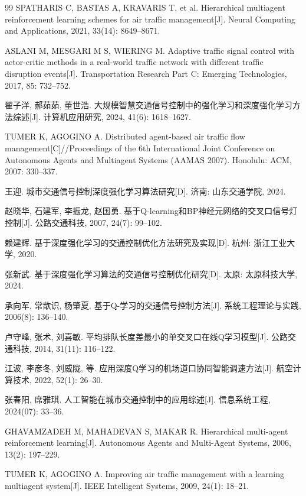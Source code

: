 \documentclass[12pt,a4paper,UTF8]{ctexart}
\begin{document}
\begin{thebibliography}{99}
 SPATHARIS C, BASTAS A, KRAVARIS T, et al. Hierarchical multiagent reinforcement learning schemes for air traffic management[J]. Neural Computing and Applications, 2021, 33(14): 8649--8671.

 ASLANI M, MESGARI M S, WIERING M. Adaptive traffic signal control with actor-critic methods in a real-world traffic network with different traffic disruption events[J]. Transportation Research Part C: Emerging Technologies, 2017, 85: 732--752.

 翟子洋, 郝茹茹, 董世浩. 大规模智慧交通信号控制中的强化学习和深度强化学习方法综述[J]. 计算机应用研究, 2024, 41(6): 1618--1627.

 TUMER K, AGOGINO A. Distributed agent-based air traffic flow management[C]//Proceedings of the 6th International Joint Conference on Autonomous Agents and Multiagent Systems (AAMAS 2007). Honolulu: ACM, 2007: 330--337.

 王迎. 城市交通信号控制深度强化学习算法研究[D]. 济南: 山东交通学院, 2024.

 赵晓华, 石建军, 李振龙, 赵国勇. 基于Q-learning和BP神经元网络的交叉口信号灯控制[J]. 公路交通科技, 2007, 24(7): 99--102.

 赖建辉. 基于深度强化学习的交通控制优化方法研究及实现[D]. 杭州: 浙江工业大学, 2020.

 张新武. 基于深度强化学习算法的交通信号控制优化研究[D]. 太原: 太原科技大学, 2024.

 承向军, 常歆识, 杨肇夏. 基于Q-学习的交通信号控制方法[J]. 系统工程理论与实践, 2006(8): 136--140.

 卢守峰, 张术, 刘喜敏. 平均排队长度差最小的单交叉口在线Q学习模型[J]. 公路交通科技, 2014, 31(11): 116--122.

 江波, 李彦冬, 刘威陇, 等. 应用深度Q学习的机场道口协同智能调速方法[J]. 航空计算技术, 2022, 52(1): 26--30.

 张春阳, 席雅琪. 人工智能在城市交通控制中的应用综述[J]. 信息系统工程, 2024(07): 33--36.

 GHAVAMZADEH M, MAHADEVAN S, MAKAR R. Hierarchical multi-agent reinforcement learning[J]. Autonomous Agents and Multi-Agent Systems, 2006, 13(2): 197--229.

 TUMER K, AGOGINO A. Improving air traffic management with a learning multiagent system[J]. IEEE Intelligent Systems, 2009, 24(1): 18--21.


\end{thebibliography}
\end{document}
